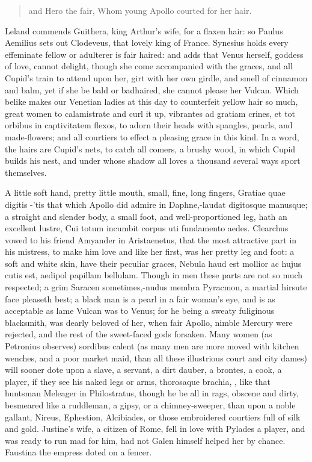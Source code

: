 \begin{verse}%
and Hero the fair,
Whom young Apollo courted for her hair.
\end{verse}%

Leland commends Guithera, king Arthur's wife, for a flaxen hair: so
Paulus Aemilius sets out Clodeveus, that lovely king of France.
Synesius holds every effeminate fellow or adulterer is fair
haired: and \Apuleius adds that Venus herself, goddess of love, cannot
delight, though she come accompanied with the graces, and all
Cupid's train to attend upon her, girt with her own girdle, and smell
of cinnamon and balm, yet if she be bald or badhaired, she cannot
please her Vulcan. Which belike makes our Venetian ladies at this day
to counterfeit yellow hair so much, great women to calamistrate and
curl it up, vibrantes ad gratiam crines, et tot orbibus in captivitatem
flexos, to adorn their heads with spangles, pearls, and made-flowers;
and all courtiers to effect a pleasing grace in this kind. In a word,
the hairs are Cupid's nets, to catch all comers, a brushy wood,
in which Cupid builds his nest, and under whose shadow all loves a
thousand several ways sport themselves.

A little soft hand, pretty little mouth, small, fine, long fingers,
Gratiae quae digitis -'tis that which Apollo did admire in
Daphne,-laudat digitosque manusque; a straight and slender body, a
small foot, and well-proportioned leg, hath an excellent lustre,
Cui totum incumbit corpus uti fundamento aedes. Clearchus vowed
to his friend Amyander in Aristaenetus, that the most attractive
part in his mistress, to make him love and like her first, was her
pretty leg and foot: a soft and white skin, \etc{} have their peculiar
graces, Nebula haud est mollior ac hujus cutis est, aedipol
papillam bellulam. Though in men these parts are not so much respected;
a grim Saracen sometimes,-nudus membra Pyracmon, a martial hirsute face
pleaseth best; a black man is a pearl in a fair woman's eye, and is as
acceptable as lame Vulcan was to Venus; for he being a sweaty
fuliginous blacksmith, was dearly beloved of her, when fair Apollo,
nimble Mercury were rejected, and the rest of the sweet-faced gods
forsaken. Many women (as Petronius observes) sordibus calent (as
many men are more moved with kitchen wenches, and a poor market maid,
than all these illustrious court and city dames) will sooner dote upon
a slave, a servant, a dirt dauber, a brontes, a cook, a player, if they
see his naked legs or arms, thorosaque brachia, \etc{}, like that
huntsman Meleager in Philostratus, though he be all in rags, obscene
and dirty, besmeared like a ruddleman, a gipsy, or a chimney-sweeper,
than upon a noble gallant, Nireus, Ephestion, Alcibiades, or those
embroidered courtiers full of silk and gold. Justine's wife, a
citizen of Rome, fell in love with Pylades a player, and was ready to
run mad for him, had not Galen himself helped her by chance. Faustina
the empress doted on a fencer.

